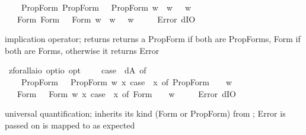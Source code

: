 \begin{isabellebody}
\ \ \ \ {\isacharparenleft}PropForm\ {\isasymalpha}{\isacharcomma}PropForm\ {\isasymbeta}{\isacharparenright}\ {\isasymRightarrow}\ PropForm\ {\isacharparenleft}{\isasymlambda}w{\isachardot}\ {\isasymalpha}\ w\ {\isasymlongrightarrow}\ {\isasymbeta}\ w{\isacharparenright}\isanewline
\ \ {\isacharbar}\ {\isacharparenleft}Form\ {\isasymalpha}{\isacharcomma}Form\ {\isasymbeta}{\isacharparenright}\ {\isasymRightarrow}\ Form\ {\isacharparenleft}{\isasymlambda}w{\isachardot}\ {\isasymalpha}\ w\ {\isasymlongrightarrow}\ {\isasymbeta}\ w{\isacharparenright}\isanewline
\ \ {\isacharbar}\ {\isacharunderscore}\ {\isasymRightarrow}\ Error\ dIO{\isachardoublequoteclose}%
\begin{isamarkuptext}%
implication operator;  returns returns a PropForm if both are PropForms, Form if both are Forms,
otherwise it returns Error%
\end{isamarkuptext}%
\isamarkuptrue%
\isamarkupfalse%
\ z{\isacharunderscore}forall{\isacharcolon}{\isacharcolon}{\isachardoublequoteopen}{\isacharparenleft}{\isacharprime}a{\isasymRightarrow}io\ opt{\isacharparenright}{\isasymRightarrow}io\ opt{\isachardoublequoteclose}\ \ {\isachardoublequoteopen}{\isasymforall}\ {\isasymPhi}\ {\isasymequiv}\ case\ {\isacharparenleft}{\isasymPhi}\ dA{\isacharparenright}\ of\isanewline
\ \ \ \ PropForm\ {\isasymphi}\ {\isasymRightarrow}\ PropForm\ {\isacharparenleft}{\isasymlambda}w{\isachardot}\ {\isasymforall}x{\isachardot}\ case\ {\isacharparenleft}{\isasymPhi}\ x{\isacharparenright}\ of\ PropForm\ {\isasympsi}\ {\isasymRightarrow}\ {\isasympsi}\ w{\isacharparenright}\isanewline
\ \ {\isacharbar}\ Form\ {\isasymphi}\ {\isasymRightarrow}\ Form\ {\isacharparenleft}{\isasymlambda}w{\isachardot}\ {\isasymforall}x{\isachardot}\ case\ {\isacharparenleft}{\isasymPhi}\ x{\isacharparenright}\ of\ Form\ {\isasympsi}\ {\isasymRightarrow}\ {\isasympsi}\ w{\isacharparenright}\isanewline
\ \ {\isacharbar}\ {\isacharunderscore}\ {\isasymRightarrow}\ Error\ dIO{\isachardoublequoteclose}%
\begin{isamarkuptext}%
universal quantification;  inherits its kind (Form or PropForm) from \isa{{\isasymphi}}; Error is passed on
 is mapped to  as expected%

\end{isamarkuptext}
\end{isabellebody}
